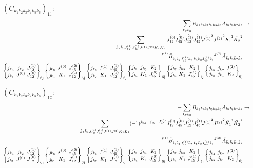 \documentclass[11pt]{article}
\newcommand{\sixj}[6]{\begingroup\setlength{\arraycolsep}{0.2em}\begin{Bmatrix} #1 & #2 & #3 \\ #4 & #5 & #6 \end{Bmatrix}_{\text{6j}}\endgroup}
\begin{document}
$\left({C}_{{k}_{1}{k}_{2}{k}_{3}{k}_{4}{k}_{5}{k}_{6}}\right)_{11}$:
\begin{align}
\sum_{{k}_{7}{k}_{8}}{B}_{{k}_{3}{k}_{2}{k}_{7}{k}_{4}{k}_{8}{k}_{6}}{A}_{{k}_{1}{k}_{8}{k}_{7}{k}_{5}}&\rightarrow \notag \\-\sum_{\tilde{k}_{7}\tilde{k}_{8}J^{(1)}_{12}J^{(1)}_{45}J^{(1)}J^{(2)}K_{1}K_{2}}\hat{J^{(0)}_{12}}\hat{J^{(0)}_{45}}\hat{J^{(1)}_{12}}\hat{J^{(1)}_{45}}\hat{J^{(1)}}^{2}\hat{J^{(2)}}^{2}\hat{K_{1}}^{2}\hat{K_{2}}^{2}& \notag \\{}^{J^{(1)}}\tilde{B}_{\tilde{k}_{3}\tilde{k}_{2}J^{(1)}_{12}\tilde{k}_{7};\tilde{k}_{4}\tilde{k}_{8}J^{(1)}_{45}\tilde{k}_{6}}{}^{J^{(2)}}\tilde{A}_{\tilde{k}_{1}\tilde{k}_{8}\tilde{k}_{7}\tilde{k}_{5}}& \notag \\\sixj{j_{{k}_{3}}}{j_{{k}_{2}}}{J^{(1)}_{12}}{j_{{k}_{1}}}{J^{(0)}}{J^{(0)}_{12}}\sixj{j_{{k}_{6}}}{J^{(0)}}{J^{(0)}_{45}}{j_{{k}_{1}}}{K_{1}}{J^{(1)}_{12}}\sixj{j_{{k}_{6}}}{J^{(1)}}{J^{(1)}_{45}}{j_{{k}_{7}}}{K_{1}}{J^{(1)}_{12}}\sixj{j_{{k}_{1}}}{j_{{k}_{5}}}{K_{2}}{j_{{k}_{4}}}{K_{1}}{J^{(0)}_{45}}\sixj{j_{{k}_{7}}}{j_{{k}_{8}}}{K_{2}}{j_{{k}_{4}}}{K_{1}}{J^{(1)}_{45}}\sixj{j_{{k}_{5}}}{j_{{k}_{7}}}{J^{(2)}}{j_{{k}_{8}}}{j_{{k}_{1}}}{K_{2}}
\end{align}

$\left({C}_{{k}_{1}{k}_{2}{k}_{3}{k}_{4}{k}_{5}{k}_{6}}\right)_{12}$:
\begin{align}
-\sum_{{k}_{7}{k}_{8}}{B}_{{k}_{3}{k}_{2}{k}_{7}{k}_{5}{k}_{8}{k}_{6}}{A}_{{k}_{1}{k}_{8}{k}_{7}{k}_{4}}&\rightarrow \notag \\\sum_{\tilde{k}_{7}\tilde{k}_{8}J^{(1)}_{12}J^{(1)}_{45}J^{(1)}J^{(2)}K_{1}K_{2}}(-1)^{j_{{k}_{4}} +j_{{k}_{5}} +J^{(0)}_{45} }\hat{J^{(0)}_{12}}\hat{J^{(0)}_{45}}\hat{J^{(1)}_{12}}\hat{J^{(1)}_{45}}\hat{J^{(1)}}^{2}\hat{J^{(2)}}^{2}\hat{K_{1}}^{2}\hat{K_{2}}^{2}& \notag \\{}^{J^{(1)}}\tilde{B}_{\tilde{k}_{3}\tilde{k}_{2}J^{(1)}_{12}\tilde{k}_{7};\tilde{k}_{5}\tilde{k}_{8}J^{(1)}_{45}\tilde{k}_{6}}{}^{J^{(2)}}\tilde{A}_{\tilde{k}_{1}\tilde{k}_{8}\tilde{k}_{7}\tilde{k}_{4}}& \notag \\\sixj{j_{{k}_{3}}}{j_{{k}_{2}}}{J^{(1)}_{12}}{j_{{k}_{1}}}{J^{(0)}}{J^{(0)}_{12}}\sixj{j_{{k}_{6}}}{J^{(0)}}{J^{(0)}_{45}}{j_{{k}_{1}}}{K_{1}}{J^{(1)}_{12}}\sixj{j_{{k}_{6}}}{J^{(1)}}{J^{(1)}_{45}}{j_{{k}_{7}}}{K_{1}}{J^{(1)}_{12}}\sixj{j_{{k}_{1}}}{j_{{k}_{4}}}{K_{2}}{j_{{k}_{5}}}{K_{1}}{J^{(0)}_{45}}\sixj{j_{{k}_{7}}}{j_{{k}_{8}}}{K_{2}}{j_{{k}_{5}}}{K_{1}}{J^{(1)}_{45}}\sixj{j_{{k}_{4}}}{j_{{k}_{7}}}{J^{(2)}}{j_{{k}_{8}}}{j_{{k}_{1}}}{K_{2}}
\end{align}
\end{document}
